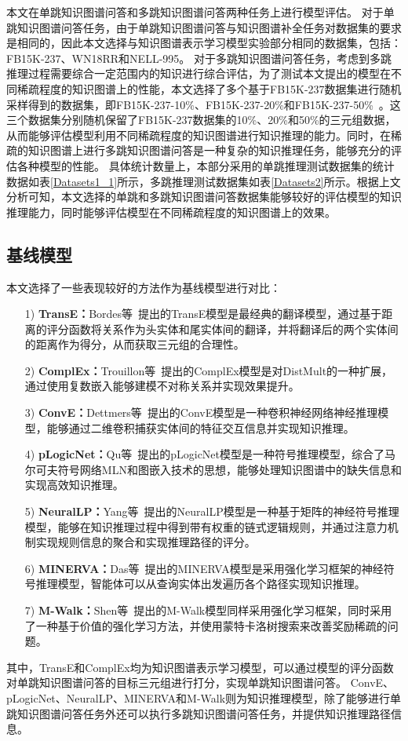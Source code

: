 \documentclass[algorithmlist, AutoFakeBold, AutoFakeSlant, figurelist, tablelist, nomlist, engineering, openany]{seuthesix} %
\begin{document}
本文在单跳知识图谱问答和多跳知识图谱问答两种任务上进行模型评估。
对于单跳知识图谱问答任务，由于单跳知识图谱问答与知识图谱补全任务对数据集的要求是相同的，因此本文选择与知识图谱表示学习模型实验部分相同的数据集，包括：FB15K-237、WN18RR和NELL-995。
对于多跳知识图谱问答任务，考虑到多跳推理过程需要综合一定范围内的知识进行综合评估，为了测试本文提出的模型在不同稀疏程度的知识图谱上的性能，本文选择了多个基于FB15K-237数据集进行随机采样得到的数据集，即FB15K-237-10\%、FB15K-237-20\%和FB15K-237-50\%~\cite{lv2020dynamic}。这三个数据集分别随机保留了FB15K-237数据集的10\%、20\%和50\%的三元组数据，从而能够评估模型利用不同稀疏程度的知识图谱进行知识推理的能力。同时，在稀疏的知识图谱上进行多跳知识图谱问答是一种复杂的知识推理任务，能够充分的评估各种模型的性能。
具体统计数量上，本部分采用的单跳推理测试数据集的统计数据如表\ref{Datasets1_1}所示，多跳推理测试数据集如表\ref{Datasets2}所示。根据上文分析可知，本文选择的单跳和多跳知识图谱问答数据集能够较好的评估模型的知识推理能力，同时能够评估模型在不同稀疏程度的知识图谱上的效果。

\subsection{基线模型}
本文选择了一些表现较好的方法作为基线模型进行对比：
\begin{itemize}
  \item [1)]\textbf{TransE：}Bordes等~\cite{bordes2013translating}提出的TransE模型是最经典的翻译模型，通过基于距离的评分函数将关系作为头实体和尾实体间的翻译，并将翻译后的两个实体间的距离作为得分，从而获取三元组的合理性。
  \item [2)]\textbf{ComplEx：}Trouillon等~\cite{trouillon2016complex}提出的ComplEx模型是对DistMult的一种扩展，通过使用复数嵌入能够建模不对称关系并实现效果提升。
  \item [3)]\textbf{ConvE：}Dettmers等~\cite{dettmers2018convolutional}提出的ConvE模型是一种卷积神经网络神经推理模型，能够通过二维卷积捕获实体间的特征交互信息并实现知识推理。
  \item [4)]\textbf{pLogicNet：}Qu等~\cite{qu2019probabilistic}提出的pLogicNet模型是一种符号推理模型，综合了马尔可夫符号网络MLN和图嵌入技术的思想，能够处理知识图谱中的缺失信息和实现高效知识推理。
  \item [5)]\textbf{NeuralLP：}Yang等~\cite{yang2017differentiable}提出的NeuralLP模型是一种基于矩阵的神经符号推理模型，能够在知识推理过程中得到带有权重的链式逻辑规则，并通过注意力机制实现规则信息的聚合和实现推理路径的评分。
  \item [6)]\textbf{MINERVA：}Das等~\cite{das2018go}提出的MINERVA模型是采用强化学习框架的神经符号推理模型，智能体可以从查询实体出发遍历各个路径实现知识推理。
  \item [7)]\textbf{M-Walk：}Shen等~\cite{shen2018m}提出的M-Walk模型同样采用强化学习框架，同时采用了一种基于价值的强化学习方法，并使用蒙特卡洛树搜索来改善奖励稀疏的问题。
\end{itemize}
其中，TransE和ComplEx均为知识图谱表示学习模型，可以通过模型的评分函数对单跳知识图谱问答的目标三元组进行打分，实现单跳知识图谱问答。
ConvE、pLogicNet、NeuralLP、MINERVA和M-Walk则为知识推理模型，除了能够进行单跳知识图谱问答任务外还可以执行多跳知识图谱问答任务，并提供知识推理路径信息。
\end{document}
